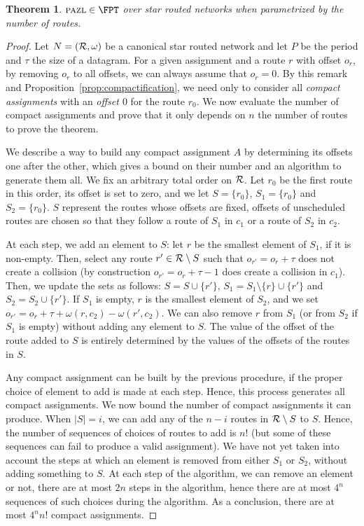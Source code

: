 \documentclass[a4paper,10pt]{journal}
\newtheorem{theorem}{Theorem}
\newcommand\pazl{\textsc{pazl}\xspace}
\begin{document}
\begin{theorem}\label{th:FPT}
$\pazl \in \FPT$ over star routed networks when parametrized by the number of routes.
\end{theorem}
\begin{proof}
Let $N = ({\cal R},\omega)$ be a canonical star routed network and let $P$ be the period and $\tau$ the size of a datagram. For a given assignment and a route $r$ with offset $o_r$, by removing $o_r$ to all offsets, we can always assume that $o_r = 0$. By this remark and Proposition~\ref{prop:compactification}, we need only to consider all \emph{compact assignments} with an \emph{offset $0$} for the route $r_0$. We now evaluate the number of compact assignments and prove that it only depends on $n$ the number of routes to prove the theorem.

 We describe a way to build any compact assignment $A$ by determining its offsets one after the other, which gives a bound on their number and an algorithm to generate them all. We fix an arbitrary total order on ${\cal R}$. Let $r_0$ be the first route in this order, its offset is set to zero, and we let $S = \{r_0\}$,
 $S_1 = \{r_0\}$ and $S_2 = \{r_0\}$. $S$ represent the routes whose offsets are fixed, 
 offsets of unscheduled routes are chosen so that they follow a route of $S_1$ in $c_1$ or a route of $S_2$ in $c_2$.

 At each step, we add an element to $S$: let $r$ be the smallest element of $S_1$, if it is non-empty. Then, select any route $r' \in {\cal R} \setminus S$ 
 such that $o_{r'} = o_{r} + \tau$ does not create a collision (by construction $o_{r'} = o_{r} + \tau - 1$ does create a collision in $c_1$). Then, we update the sets as follows:
 $S = S \cup \{r'\}$, $S_1 = S_1 \setminus \{r\} \cup \{r'\}$ and $S_2 = S_2 \cup \{r'\}$. If 
 $S_1$ is empty, $r$ is the smallest element of $S_2$, and we set $o_{r'} = o_{r} + \tau + \omega(r,c_2) - \omega(r',c_2)$.
 We can also remove $r$ from $S_1$ (or from $S_2$ if $S_1$ is empty) without adding any element to $S$. The value of the offset of the route added to $S$ is entirely determined by the values of the offsets of the routes in $S$.

 Any compact assignment can be built by the previous procedure, if the proper choice of element to add is made at each step. Hence, this process generates all compact assignments. We now bound the number of compact assignments it can produce. When $|S| = i$, we can add any of the $n-i$ routes in ${\cal R} \setminus S$ to $S$. Hence, the number of sequences of choices of routes to add is $n!$ (but some of these sequences can fail to produce a valid assignment). We have not yet taken into account the steps at which an element is removed from either $S_1$ or $S_2$, without adding something to $S$. At each step of the algorithm, we can remove an element or not, there are at most $2n$ steps in the algorithm, hence there are at most $4^n$ sequences of such choices during the algorithm. As a conclusion, there are at most $4^nn!$ compact assignments.


\end{proof}
\end{document}
